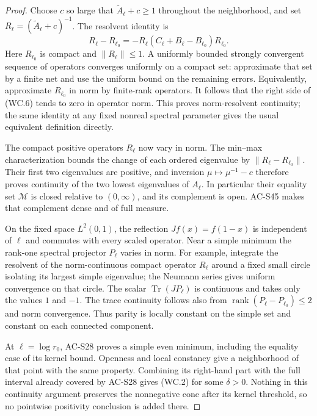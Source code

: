 \begin{proof}
Choose \(c\) so large that \(\widetilde A_\ell+c\geq1\)
throughout the neighborhood, and set
\(R_\ell=(\widetilde A_\ell+c)^{-1}\).
The resolvent identity is
\[
 R_\ell-R_{\ell_0}
  =-R_\ell(C_\ell+B_\ell-B_{\ell_0})R_{\ell_0}.          \tag{WC.6}
\]
Here \(R_{\ell_0}\) is compact and \(\|R_\ell\|\leq1\).
A uniformly bounded strongly convergent sequence of operators
converges uniformly on a compact set: approximate that set
by a finite net and use the uniform bound on the remaining
errors.  Equivalently, approximate \(R_{\ell_0}\) in norm
by finite-rank operators.
It follows that the right side of (WC.6) tends to zero in
operator norm.  This proves norm-resolvent continuity;
the same identity at any fixed nonreal spectral parameter
gives the usual equivalent definition directly.

The compact positive operators \(R_\ell\) now vary in norm.
The min--max characterization bounds the change of each
ordered eigenvalue by \(\|R_\ell-R_{\ell_0}\|\).
Their first two eigenvalues are positive, and inversion
\(\mu\mapsto\mu^{-1}-c\) therefore proves continuity of
the two lowest eigenvalues of \(A_\ell\).
In particular their equality set \(\mathcal M\) is closed
relative to \((0,\infty)\), and its complement is open.
AC-S45 makes that complement dense and of full measure.

On the fixed space \(L^2(0,1)\), the reflection
\(Jf(x)=f(1-x)\) is independent of \(\ell\) and commutes
with every scaled operator.  Near a simple minimum the
rank-one spectral projector \(P_\ell\) varies in norm.
For example, integrate the resolvent of the norm-continuous
compact operator \(R_\ell\) around a fixed small circle
isolating its largest simple eigenvalue; the Neumann series
gives uniform convergence on that circle.
The scalar \(\operatorname{Tr}(JP_\ell)\) is continuous
and takes only the values \(1\) and \(-1\).
The trace continuity follows also from
\(\operatorname{rank}(P_\ell-P_{\ell_0})\leq2\)
and norm convergence.
Thus parity is locally constant on the simple set and
constant on each connected component.

At \(\ell=\log r_0\), AC-S28 proves a simple even
minimum, including the equality case of its kernel bound.
Openness and local constancy give a neighborhood of that
point with the same property.  Combining its right-hand
part with the full interval already covered by AC-S28
gives (WC.2) for some \(\delta>0\).
Nothing in this continuity argument preserves the
nonnegative cone after its kernel threshold, so no
pointwise positivity conclusion is added there.
\end{proof}
